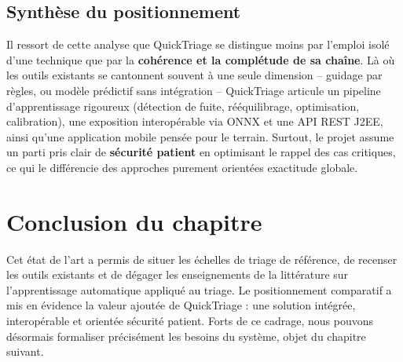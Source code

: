 \subsection{Synthèse du positionnement}
Il ressort de cette analyse que QuickTriage se distingue moins par l'emploi isolé d'une
technique que par la \textbf{cohérence et la complétude de sa chaîne}. Là où les outils
existants se cantonnent souvent à une seule dimension -- guidage par règles, ou modèle
prédictif sans intégration -- QuickTriage articule un pipeline d'apprentissage rigoureux
(détection de fuite, rééquilibrage, optimisation, calibration), une exposition
interopérable via ONNX et une API REST J2EE, ainsi qu'une application mobile pensée pour le
terrain. Surtout, le projet assume un parti pris clair de \textbf{sécurité patient} en
optimisant le rappel des cas critiques, ce qui le différencie des approches purement
orientées exactitude globale.

\section*{Conclusion du chapitre}
Cet état de l'art a permis de situer les échelles de triage de référence, de recenser les
outils existants et de dégager les enseignements de la littérature sur l'apprentissage
automatique appliqué au triage. Le positionnement comparatif a mis en évidence la valeur
ajoutée de QuickTriage : une solution intégrée, interopérable et orientée sécurité patient.
Forts de ce cadrage, nous pouvons désormais formaliser précisément les besoins du système,
objet du chapitre suivant.
